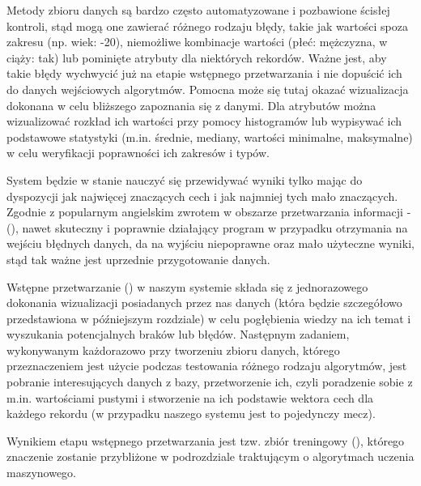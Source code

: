 Metody zbioru danych są bardzo często automatyzowane i pozbawione ścisłej kontroli, stąd mogą one zawierać różnego rodzaju błędy, takie jak wartości spoza zakresu (np. wiek: -20), niemożliwe kombinacje wartości (płeć: mężczyzna, w ciąży: tak) lub pominięte atrybuty dla niektórych rekordów. Ważne jest, aby takie błędy wychwycić już na etapie wstępnego przetwarzania i nie dopuścić ich do danych wejściowych algorytmów. Pomocna może się tutaj okazać wizualizacja dokonana w celu bliższego zapoznania się z danymi. Dla atrybutów można wizualizować rozkład ich wartości przy pomocy histogramów lub wypisywać ich podstawowe statystyki (m.in. średnie, mediany, wartości minimalne, maksymalne) w celu weryfikacji poprawności ich zakresów i typów.

System będzie w stanie nauczyć się przewidywać wyniki tylko mając do dyspozycji jak najwięcej znaczących cech i jak najmniej tych mało znaczących. Zgodnie z popularnym angielskim zwrotem w obszarze przetwarzania informacji -   (), nawet skuteczny i poprawnie działający program w przypadku otrzymania na wejściu błędnych danych, da na wyjściu niepoprawne oraz mało użyteczne wyniki, stąd tak ważne jest uprzednie przygotowanie danych.

Wstępne przetwarzanie () w naszym systemie składa się z jednorazowego dokonania wizualizacji posiadanych przez nas danych (która będzie szczegółowo przedstawiona w późniejszym rozdziale) w celu pogłębienia wiedzy na ich temat i wyszukania potencjalnych braków lub błędów. Następnym zadaniem, wykonywanym każdorazowo przy tworzeniu zbioru danych, którego przeznaczeniem jest użycie podczas testowania różnego rodzaju algorytmów, jest pobranie interesujących danych z bazy, przetworzenie ich, czyli poradzenie sobie z m.in. wartościami pustymi i stworzenie na ich podstawie wektora cech dla każdego rekordu (w przypadku naszego systemu jest to pojedynczy mecz). 

Wynikiem etapu wstępnego przetwarzania jest tzw. zbiór treningowy (), którego znaczenie zostanie przybliżone w podrozdziale traktującym o algorytmach uczenia maszynowego.

